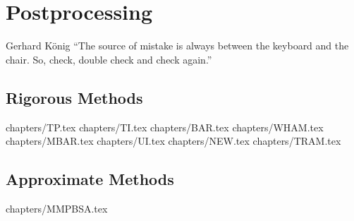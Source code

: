 \chapter{Postprocessing\label{chapter:FEM}}
\begin{chapquote}{Gerhard K\"onig%
	}
	``The source of mistake is always between the keyboard and the chair. So, check, double check and check again.''
\end{chapquote}
\section{Rigorous Methods}
 {chapters/TP.tex}
\clearpage 
 {chapters/TI.tex}
\clearpage
 {chapters/BAR.tex}
\clearpage 
 {chapters/WHAM.tex}
\clearpage 
 {chapters/MBAR.tex}
\clearpage 
 {chapters/UI.tex}
\clearpage
 {chapters/NEW.tex}
\clearpage 
 {chapters/TRAM.tex}
\clearpage 
\section{Approximate Methods}
 {chapters/MMPBSA.tex}